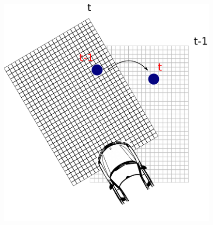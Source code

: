 \documentclass{beamer}
\begin{document}
\begin{frame}
\begin{columns}[t]
		  \begin{column}{5cm}
			\begin{figure}[h]
			\center
			\includegraphics[scale=0.2]{img/fig:motion:algorithm:nonstatic:03}
		\end{figure}	
		  \end{column}
		 \end{columns}		 

	\end{frame}
\end{document}
